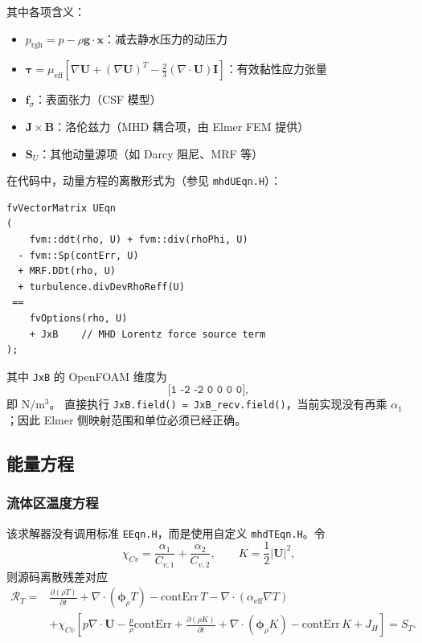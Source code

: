 \documentclass[11pt,a4paper]{article}
\begin{document}
其中各项含义：
\begin{itemize}
    \item $p_{\text{rgh}} = p - \rho \mathbf{g} \cdot \mathbf{x}$：减去静水压力的动压力
    \item $\bm{\tau} = \mu_{\text{eff}} \left[\nabla \mathbf{U} + (\nabla \mathbf{U})^T - \frac{2}{3}(\nabla \cdot \mathbf{U})\mathbf{I}\right]$：有效黏性应力张量
    \item $\mathbf{f}_\sigma$：表面张力（CSF 模型）
    \item $\mathbf{J} \times \mathbf{B}$：洛伦兹力（MHD 耦合项，由 Elmer FEM 提供）
    \item $\mathbf{S}_U$：其他动量源项（如 Darcy 阻尼、MRF 等）
\end{itemize}

在代码中，动量方程的离散形式为（参见 \texttt{mhdUEqn.H}）：

\begin{lstlisting}[style=cppstyle]
fvVectorMatrix UEqn
(
    fvm::ddt(rho, U) + fvm::div(rhoPhi, U)
  - fvm::Sp(contErr, U)
  + MRF.DDt(rho, U)
  + turbulence.divDevRhoReff(U)
 ==
    fvOptions(rho, U)
    + JxB    // MHD Lorentz force source term
);
\end{lstlisting}

其中 \texttt{JxB} 的 OpenFOAM 维度为
\[
\texttt{[1 -2 -2 0 0 0 0]},
\]
即 $\mathrm{N/m^3}$。
 直接执行
\texttt{JxB.field() = JxB\_recv.field()}，当前实现没有再乘
$\alpha_1$；因此 Elmer 侧映射范围和单位必须已经正确。

\subsection{能量方程}

\subsubsection{流体区温度方程}

该求解器没有调用标准 \texttt{EEqn.H}，而是使用自定义
\texttt{mhdTEqn.H}。令
\[
\chi_{Cv}=\frac{\alpha_1}{C_{v,1}}+
\frac{\alpha_2}{C_{v,2}},\qquad
K=\frac{1}{2}|\mathbf{U}|^2 ,
\]
则源码离散残差对应
\begin{equation}
\begin{aligned}
\mathcal{R}_T={}&
\frac{\partial(\rho T)}{\partial t}
+\nabla\cdot(\boldsymbol{\phi}_\rho T)
-\mathrm{contErr}\,T
-\nabla\cdot(\alpha_{\mathrm{eff}}\nabla T)\\
&+\chi_{Cv}\left[
p\nabla\cdot\mathbf{U}
-\frac{p}{\rho}\mathrm{contErr}
+\frac{\partial(\rho K)}{\partial t}
+\nabla\cdot(\boldsymbol{\phi}_\rho K)
-\mathrm{contErr}\,K
+J_H
\right]
=S_T .
\end{aligned}
\label{eq:TEqn}
\end{equation}
\end{document}
